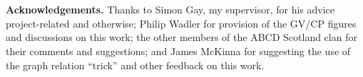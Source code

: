 \\~\\
{\bf Acknowledgements.} Thanks to Simon Gay, my supervisor, for his advice
project-related and otherwise; Philip Wadler for provision of the GV/CP
figures and discussions on this work; the other members of the ABCD Scotland
clan for their comments and suggestions; and James McKinna for suggesting the
use of the graph relation ``trick'' and other feedback on this work.
